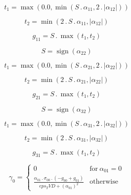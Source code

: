 \documentclass{article}
\begin{document}
\begin{dmath}t_{1} = \max\left(0.0, \min\left(S \,.\, \alpha_{11}, 2 \,.\, \left|{\alpha_{12}}\right|\right)\right)\end{dmath}

\begin{dmath}t_{2} = \min\left(2 \,.\, S \,.\, \alpha_{11}, \left|{\alpha_{12}}\right|\right)\end{dmath}

\begin{dmath}g_{11} = S \,.\, \max\left(t_{1}, t_{2}\right)\end{dmath}

\begin{dmath}S = \operatorname{sign}{\left (\alpha_{22} \right )}\end{dmath}

\begin{dmath}t_{1} = \max\left(0.0, \min\left(S \,.\, \alpha_{21}, 2 \,.\, \left|{\alpha_{22}}\right|\right)\right)\end{dmath}

\begin{dmath}t_{2} = \min\left(2 \,.\, S \,.\, \alpha_{21}, \left|{\alpha_{22}}\right|\right)\end{dmath}

\begin{dmath}g_{21} = S \,.\, \max\left(t_{1}, t_{2}\right)\end{dmath}

\begin{dmath}S = \operatorname{sign}{\left (\alpha_{32} \right )}\end{dmath}

\begin{dmath}t_{1} = \max\left(0.0, \min\left(S \,.\, \alpha_{31}, 2 \,.\, \left|{\alpha_{32}}\right|\right)\right)\end{dmath}

\begin{dmath}t_{2} = \min\left(2 \,.\, S \,.\, \alpha_{31}, \left|{\alpha_{32}}\right|\right)\end{dmath}

\begin{dmath}g_{31} = S \,.\, \max\left(t_{1}, t_{2}\right)\end{dmath}

\begin{dmath}\gamma_{0} = \begin{cases} 0 & \text{for}\: \alpha_{01} = 0 \\\frac{\alpha_{01} \,.\, \sigma_{0 0} \,.\, \left(- g_{00} + g_{01}\right)}{eps_TVD + \left(\alpha_{01} \right)^{2}} & \text{otherwise} \end{cases}\end{dmath}
\end{document}

